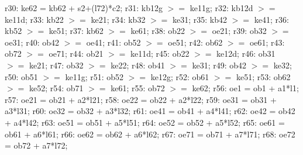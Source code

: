 \documentclass[a4paper,11pt, titlepage]{article}
\begin{document}
\begin{flushleft}
r30: ke62 = kb62 + s2+(l72)*c2;\linebreak
\linebreak
r31: kb12g $>=$ ke11g;\linebreak
r32: kb12d $>=$ ke11d;\linebreak
r33: kb22 $>=$ ke21;\linebreak
r34: kb32 $>=$ ke31;\linebreak
r35: kb42 $>=$ ke41;\linebreak
r36: kb52 $>=$ ke51;\linebreak
r37: kb62 $>=$ ke61;\linebreak
\linebreak
r38: ob22 $>=$ oe21;\linebreak
r39: ob32 $>=$ oe31;\linebreak
r40: ob42 $>=$ oe41;\linebreak
r41: ob52 $>=$ oe51;\linebreak
r42: ob62 $>=$ oe61;\linebreak
r43: ob72 $>=$ oe71;\linebreak
\linebreak
r44: ob21 $>=$ ke11d;\linebreak
r45: ob22 $>=$ ke12d;\linebreak
r46: ob31 $>=$ ke21;\linebreak
r47: ob32 $>=$ ke22;\linebreak
r48: ob41 $>=$ ke31;\linebreak
r49: ob42 $>=$ ke32;\linebreak
r50: ob51 $>=$ ke11g;\linebreak
r51: ob52 $>=$ ke12g;\linebreak
r52: ob61 $>=$ ke51;\linebreak
r53: ob62 $>=$ ke52;\linebreak
r54: ob71 $>=$ ke61;\linebreak
r55: ob72 $>=$ ke62;\linebreak
\linebreak
r56: oe1 = ob1 + a1*l1;\linebreak
r57: oe21 = ob21 + a2*l21;\linebreak
r58: oe22 = ob22 + a2*l22;\linebreak
r59: oe31 = ob31 + a3*l31;\linebreak
r60: oe32 = ob32 + a3*l32;\linebreak
r61: oe41 = ob41 + a4*l41;\linebreak
r62: oe42 = ob42 + a4*l42;\linebreak
r63: oe51 = ob51 + a5*l51;\linebreak
r64: oe52 = ob52 + a5*l52;\linebreak
r65: oe61 = ob61 + a6*l61;\linebreak
r66: oe62 = ob62 + a6*l62;\linebreak
r67: oe71 = ob71 + a7*l71;\linebreak
r68: oe72 = ob72 + a7*l72;\linebreak
\end{flushleft}
\end{document}
